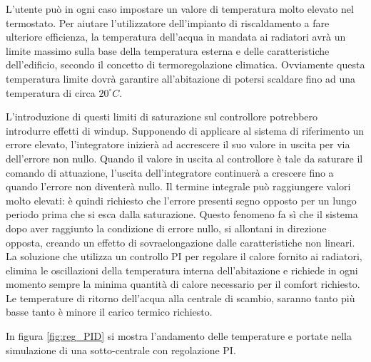 \documentclass[laurea,oneside,11pt]{USiena_tesiLM}
\begin{document}
L'utente può in ogni caso impostare un valore di temperatura molto elevato nel termostato. Per aiutare l'utilizzatore dell'impianto di riscaldamento a fare ulteriore efficienza, la temperatura dell'acqua in mandata ai radiatori avrà un limite massimo sulla base della temperatura esterna e delle caratteristiche dell'edificio, secondo il concetto di termoregolazione climatica. 
Ovviamente questa temperatura limite dovrà garantire all'abitazione di potersi scaldare fino ad una temperatura di circa $20 ^{\circ}C$.

L'introduzione di questi limiti di saturazione sul controllore potrebbero introdurre effetti di windup.
Supponendo di applicare al sistema di riferimento un errore elevato, l'integratore inizierà ad accrescere il suo valore in uscita per via dell'errore non nullo. Quando il valore in uscita al controllore è tale da saturare il comando di attuazione, l'uscita dell'integratore continuerà a crescere fino a quando l'errore non diventerà nullo.
Il termine integrale può raggiungere valori molto elevati: è quindi richiesto che l'errore presenti segno opposto per un lungo periodo prima che si esca dalla saturazione. 
Questo fenomeno fa sì che il sistema dopo aver raggiunto la condizione di errore nullo, si allontani in direzione opposta, creando un effetto di sovraelongazione dalle caratteristiche non lineari.\\


La soluzione che utilizza un controllo PI per regolare il calore fornito ai radiatori, elimina le oscillazioni della temperatura interna dell'abitazione e richiede in ogni momento sempre la minima quantità di calore necessario per il comfort richiesto. Le temperature di ritorno dell'acqua alla centrale di scambio, saranno tanto più basse tanto è minore il carico termico richiesto. 

In figura \ref{fig:reg_PID} si mostra l'andamento delle temperature e portate nella simulazione di una sotto-centrale con regolazione PI.
\end{document}
